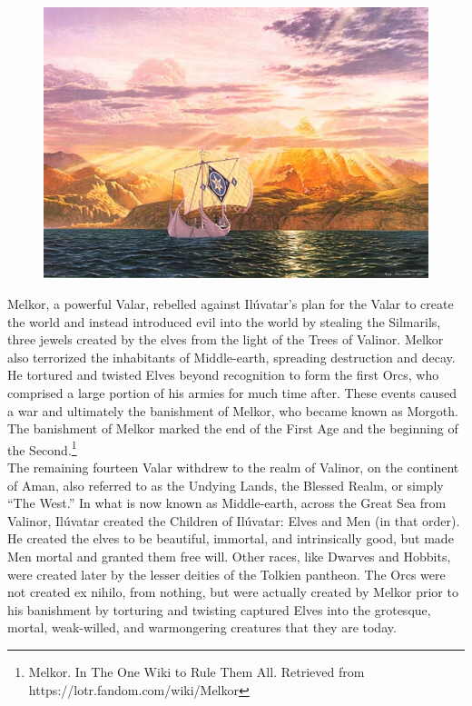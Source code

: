 \documentclass[10pt, letterpaper]{article}
\begin{document}
    \begin{figure}
        \centering
        \includegraphics[scale = 0.45]{image3.png}
    \end{figure}
        
    \noindent Melkor, a powerful Valar, rebelled against Ilúvatar’s plan for the Valar to create the world and instead introduced evil into the world by stealing the Silmarils, three jewels created by the elves from the light of the Trees of Valinor. Melkor also terrorized the inhabitants of Middle-earth, spreading destruction and decay. He tortured and twisted Elves beyond recognition to form the first Orcs, who comprised a large portion of his armies for much time after. These events caused a war and ultimately the banishment of Melkor, who became known as Morgoth. The banishment of Melkor marked the end of the First Age and the beginning of the Second.\footnote{Melkor. In The One Wiki to Rule Them All. Retrieved from https://lotr.fandom.com/wiki/Melkor} \\
        
        
    \noindent The remaining fourteen Valar withdrew to the realm of Valinor, on the continent of Aman, also referred to as the Undying Lands, the Blessed Realm, or simply “The West.” In what is now known as Middle-earth, across the Great Sea from Valinor, Ilúvatar created the Children of Ilúvatar: Elves and Men (in that order). He created the elves to be beautiful, immortal, and intrinsically good, but made Men mortal and granted them free will. Other races, like Dwarves and Hobbits, were created later by the lesser deities of the Tolkien pantheon. The Orcs were not created ex nihilo, from nothing, but were actually created by Melkor prior to his banishment by torturing and twisting captured Elves into the grotesque, mortal, weak-willed, and warmongering creatures that they are today. \\
        
\end{document}
